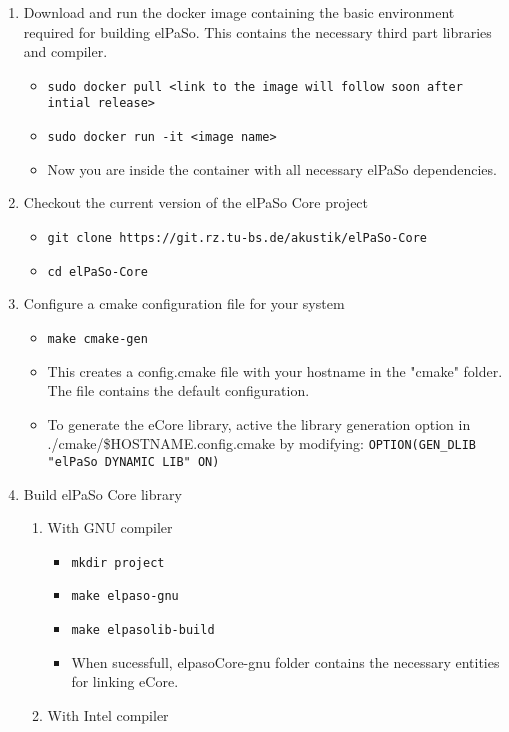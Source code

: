 \begin{enumerate}
    \item Download and run the docker image containing the basic environment required for building elPaSo. This contains the necessary third part libraries and compiler.
    \begin{itemize}
        \item \texttt{sudo docker pull <link to the image will follow soon after intial release>}
        \item \texttt{sudo docker run -it <image name>}
        \item Now you are inside the container with all necessary elPaSo dependencies.
    \end{itemize}
    \item Checkout the current version of the elPaSo Core project
    \begin{itemize}
        \item \texttt{git clone https://git.rz.tu-bs.de/akustik/elPaSo-Core}
        \item \texttt{cd elPaSo-Core}
    \end{itemize}
    \item Configure a cmake configuration file for your system
    \begin{itemize}
        \item \texttt{make cmake-gen}
        \item This creates a config.cmake file with your hostname in the "cmake" folder. The file contains the default configuration.
        \item To generate the eCore library, active the library generation option in ./cmake/\$HOSTNAME.config.cmake by modifying: \texttt{OPTION(GEN\_DLIB			"elPaSo DYNAMIC LIB"	ON)}
    \end{itemize}
    \item Build elPaSo Core library
    \begin{enumerate}
        \item With GNU compiler
        \begin{itemize}
            \item \texttt{mkdir project}
            \item \texttt{make elpaso-gnu}
            \item \texttt{make elpasolib-build}
            \item When sucessfull, elpasoCore-gnu folder contains the necessary entities for linking eCore.
        \end{itemize}
        \item With Intel compiler

\end{enumerate}
\end{enumerate}
